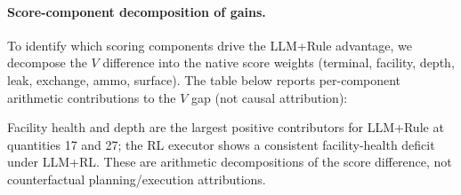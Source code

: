 \documentclass[sigconf,anonymous]{aamas}
\begin{document}
\paragraph{Score-component decomposition of gains.}
To identify which scoring components drive the LLM+Rule advantage, we decompose the $V$ difference into the native score weights (terminal, facility, depth, leak, exchange, ammo, surface). The table below reports per-component arithmetic contributions to the $V$ gap (not causal attribution):

\begin{center}
\end{center}

Facility health and depth are the largest positive contributors for LLM+Rule at quantities 17 and 27; the RL executor shows a consistent facility-health deficit under LLM+RL. These are arithmetic decompositions of the score difference, not counterfactual planning/execution attributions.
\end{document}
